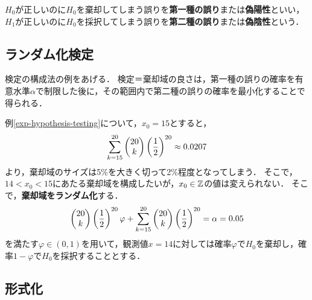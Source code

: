 \documentclass[uplatex,dvipdfmx]{jsreport}
\begin{document}
\begin{definition}
    $H_0$が正しいのに$H_0$を棄却してしまう誤りを\textbf{第一種の誤り}または\textbf{偽陽性}といい，$H_1$が正しいのに$H_0$を採択してしまう誤りを\textbf{第二種の誤り}または\textbf{偽陰性}という．
\end{definition}

\subsection{ランダム化検定}

\begin{tcolorbox}[colframe=ForestGreen, colback=ForestGreen!10!white,breakable,colbacktitle=ForestGreen!40!white,coltitle=black,fonttitle=\bfseries\sffamily,
title=]
    検定の構成法の例をあげる．
    検定＝棄却域の良さは，第一種の誤りの確率を有意水準$\alpha$で制限した後に，その範囲内で第二種の誤りの確率を最小化することで得られる．
\end{tcolorbox}

\begin{example}
    例\ref{exp-hypothesis-testing}について，$x_0=15$とすると，
    \[\sum^{20}_{k=15}\begin{pmatrix}20\\k\end{pmatrix}\left(\frac{1}{2}\right)^{20}\approx 0.0207\]
    より，棄却域のサイズは5\%を大きく切って2\%程度となってしまう．
    そこで，$14<x_0<15$にあたる棄却域を構成したいが，$x_0\in\mathbb{Z}$の値は変えられない．
    そこで，\textbf{棄却域をランダム化}する．
    \[\begin{pmatrix}20\\k\end{pmatrix}\left(\frac{1}{2}\right)^{20}\varphi+\sum^{20}_{k=15}\begin{pmatrix}20\\k\end{pmatrix}\left(\frac{1}{2}\right)^{20}=\alpha=0.05\]
    を満たす$\varphi\in(0,1)$を用いて，観測値$x=14$に対しては確率$\varphi$で$H_0$を棄却し，確率$1-\varphi$で$H_0$を採択することとする．
\end{example}

\subsection{形式化}
\end{document}
